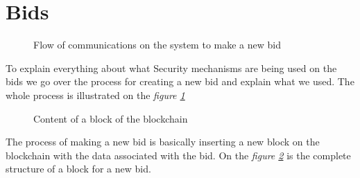\documentclass[12pt]{article}
\begin{document}
\section{Bids}
\label{sec:newBid}
\begin{figure}[h]
  \caption{Flow of communications on the system to make a new bid}
  \label{fig:newBid}
\end{figure}

To explain everything about what Security mechanisms are being used on the bids we go over the process
  for creating a new bid and explain what we used. The whole process is illustrated on the \textit{figure
  \ref{fig:newBid}}

\begin{figure}[h]
  \caption{Content of a block of the blockchain}
  \label{fig:block}
\end{figure}

The process of making a new bid is basically inserting a new block on the blockchain with the data associated
  with the bid. On the \textit{figure \ref{fig:block}} is the complete structure of a block for a new bid.
\end{document}
